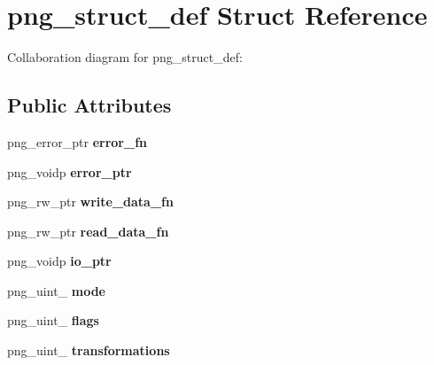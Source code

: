 \hypertarget{structpng__struct__def}{\section{png\+\_\+struct\+\_\+def Struct Reference}
\label{structpng__struct__def}
}


Collaboration diagram for png\+\_\+struct\+\_\+def\+:
\subsection*{Public Attributes}
\begin{DoxyCompactItemize}
\item 
\hypertarget{structpng__struct__def_a2cc5bd1cf507373992a61cf725a730cd}{png\+\_\+error\+\_\+ptr {\bfseries error\+\_\+fn}}\label{structpng__struct__def_a2cc5bd1cf507373992a61cf725a730cd}

\item 
\hypertarget{structpng__struct__def_a06837611b772a6a44cf6306ea08d40a8}{png\+\_\+voidp {\bfseries error\+\_\+ptr}}\label{structpng__struct__def_a06837611b772a6a44cf6306ea08d40a8}

\item 
\hypertarget{structpng__struct__def_acc53cd87f0ffc4d1f67da7e10a94af39}{png\+\_\+rw\+\_\+ptr {\bfseries write\+\_\+data\+\_\+fn}}\label{structpng__struct__def_acc53cd87f0ffc4d1f67da7e10a94af39}

\item 
\hypertarget{structpng__struct__def_a83804076437d1587fab947c056bb56ae}{png\+\_\+rw\+\_\+ptr {\bfseries read\+\_\+data\+\_\+fn}}\label{structpng__struct__def_a83804076437d1587fab947c056bb56ae}

\item 
\hypertarget{structpng__struct__def_a996f6f8aaa00ede3bb147714ee7c480e}{png\+\_\+voidp {\bfseries io\+\_\+ptr}}\label{structpng__struct__def_a996f6f8aaa00ede3bb147714ee7c480e}

\item 
\hypertarget{structpng__struct__def_a6db33193ca2fdb01fa6d8da9756bd448}{png\+\_\+uint\+\_ {\bfseries mode}}\label{structpng__struct__def_a6db33193ca2fdb01fa6d8da9756bd448}

\item 
\hypertarget{structpng__struct__def_aa7529cc3d13e759037c504fddd6e1ae8}{png\+\_\+uint\+\_ {\bfseries flags}}\label{structpng__struct__def_aa7529cc3d13e759037c504fddd6e1ae8}

\item 
\hypertarget{structpng__struct__def_a4ab3e33248dd4c32880609a1a10fa725}{png\+\_\+uint\+\_ {\bfseries transformations}}\label{structpng__struct__def_a4ab3e33248dd4c32880609a1a10fa725}


\end{DoxyCompactItemize}
